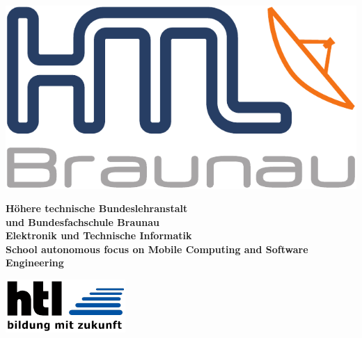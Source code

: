 \begin{minipage}[c]{0.20\linewidth}
\includegraphics[width=0.8\linewidth]{media/images/htl_c_cmyk_rein}
\end{minipage}
\begin{minipage}[c]{0.6\linewidth}
\begin{center}
{\bfseries\sffamily\large Höhere  technische  Bundeslehranstalt\\
und  Bundesfachschule  Braunau\\
Elektronik und Technische Informatik\\
{\normalsize School autonomous focus on Mobile Computing and Software Engineering} }
\end{center}
\end{minipage}
\begin{minipage}[c]{0.2\linewidth}
\hfill \includegraphics[width=0.8\linewidth]{media/images/htl-bildung-mit-zukunft}
\end{minipage}\\

\vspace{1em}

